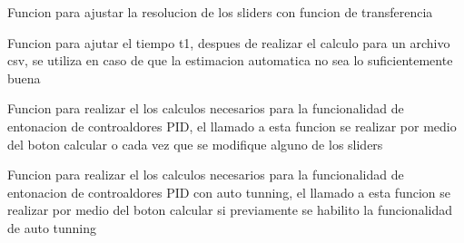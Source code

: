 \documentclass[letterpaper,10pt,spanish]{sphinxmanual}
\begin{document}

\begin{fulllineitems}
\label{\detokenize{codigos/TuningHandler:TuningHandler.actualizar_sliders_tf}}
Funcion para ajustar la resolucion de los sliders con funcion de transferencia

\end{fulllineitems}


\begin{fulllineitems}
\label{\detokenize{codigos/TuningHandler:TuningHandler.ajustar_atraso_manual}}
Funcion para ajutar el tiempo t1, despues de realizar el calculo para un archivo csv, se utiliza en caso de que la estimacion automatica no sea lo suficientemente buena

\end{fulllineitems}


\begin{fulllineitems}
\label{\detokenize{codigos/TuningHandler:TuningHandler.calcular_PID}}
Funcion para realizar el los calculos necesarios para la funcionalidad de entonacion de controaldores PID, el llamado a esta funcion se realizar por medio del boton calcular o cada vez que se modifique alguno de los sliders

\end{fulllineitems}


\begin{fulllineitems}
\label{\detokenize{codigos/TuningHandler:TuningHandler.calcular_autotuning}}
Funcion para realizar el los calculos necesarios para la funcionalidad de entonacion de controaldores PID con auto tunning, el llamado a esta funcion se realizar por medio del boton calcular si previamente se habilito la funcionalidad de auto tunning

\end{fulllineitems}
\end{document}
